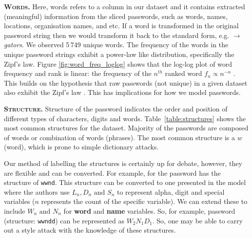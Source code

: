 \textbf{\textsc{Words.}}\: Here, words refers to a column in our dataset and it contains extracted (meaningful) information from the sliced passwords, such as words, names, locations, organisation names, and etc. If a word is transformed in the original password string then we would transform it back to the standard form, e.g.  $\rightarrow$ \textit{gators}. We observed 5\,749 unique words. The frequency of the words in the unique password strings exhibit a power-law like distribution, specifically the Zipf's law. Figure \ref{fig:word_freq_loglog} shows that the log-log plot of word frequency and rank is linear: the frequency of the $n^{th}$ ranked word $f_n \propto n^{-\alpha}$ \cite{Kobayashi_Mark_Turin_2011}. This builds on the hypothesis that raw passwords (not unique) in a given dataset also exhibit the Zipf's law \cite{wang_zipfs_2017}. This has implications for how we model passwords.




\textbf{\textsc{Structure.}}\: Structure of the password indicates the order and position of different types of characters, digits and words. Table~\ref{table:structures} shows the most common structures for the \hmail dataset. Majority of the passwords are composed of words or combination of words (phrases). The most common structure is a $w$ (word), which is prone to simple dictionary attacks. 

Our method of labelling the structures is certainly up for debate, however, they are flexible and can be converted. For example, for the password  has the structure of \texttt{wwnd}. This structure can be converted to one presented in the \pcfg model where the authors use $L_n, D_n \text{ and } S_n$ to represent alpha, digit and special variables ($n$ represents the count of the specific variable). We can extend these to include $W_n \text{ and } N_n$  for \textbf{word} and \textbf{name} variables. So, for example, password (structure: \texttt{wwndd}) can be represented as $W_2 N_1 D_1$. So, one may be able to carry out a \pcfg style attack with the knowledge of these structures.

